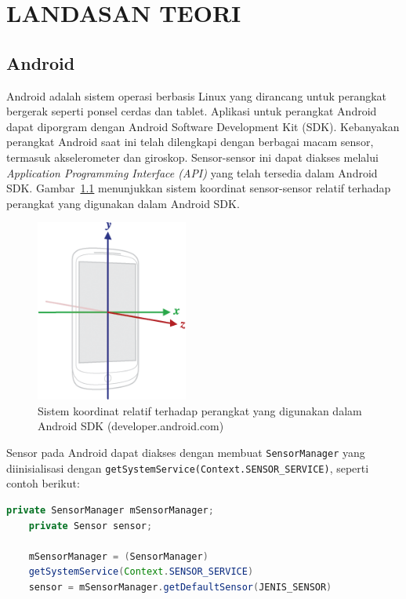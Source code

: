 \chapter{LANDASAN TEORI}

\section{Android}
Android adalah sistem operasi berbasis Linux yang dirancang untuk perangkat bergerak seperti ponsel cerdas dan tablet. Aplikasi untuk perangkat Android dapat diporgram dengan Android Software Development Kit (SDK). Kebanyakan perangkat Android saat ini telah dilengkapi dengan berbagai macam sensor, termasuk akselerometer dan giroskop. Sensor-sensor ini dapat diakses melalui \textit{Application Programming Interface (API)} yang telah tersedia dalam Android SDK\@. Gambar~\ref{gambar:koordinat-sensor-android} menunjukkan sistem koordinat sensor-sensor relatif terhadap perangkat yang digunakan dalam Android SDK\@.

\begin{figure}[h!]
    \centering
    \includegraphics[width=5cm]{gambar/landasan-teori/axis_device.png}
    \caption{Sistem koordinat relatif terhadap perangkat yang digunakan dalam Android SDK (developer.android.com)}
    \label{gambar:koordinat-sensor-android}
\end{figure}

Sensor pada Android dapat diakses dengan membuat \lstinline{SensorManager} yang diinisialisasi dengan \lstinline{getSystemService(Context.SENSOR_SERVICE)}, seperti contoh berikut:

\begin{lstlisting}[language=Java]
    private SensorManager mSensorManager;
    private Sensor sensor;

    mSensorManager = (SensorManager)
    getSystemService(Context.SENSOR_SERVICE)
    sensor = mSensorManager.getDefaultSensor(JENIS_SENSOR)
\end{lstlisting}


